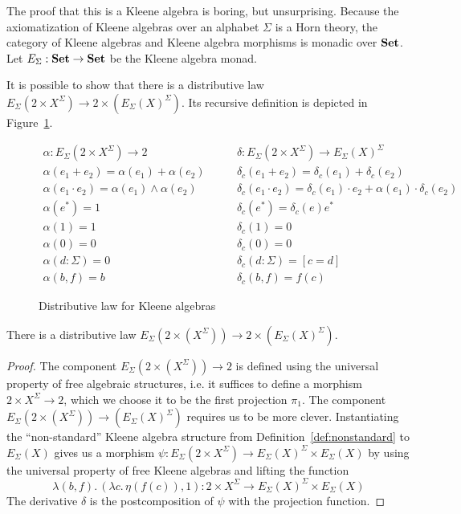 \documentclass[acmsmall,anonymous,review,screen]{acmart}
\newcommand{\cat}[1]{
  \relax
  \StrLen{#1}[\arglength]
  \ifnum\arglength=1
  \mathcal{#1}
  \else
  \mathbf{#1}
  \fi
}
\newcommand{\Set}{\cat{Set}}
\begin{document}
The proof that this is a Kleene algebra is boring, but unsurprising.
Because the axiomatization of Kleene algebras over an alphabet $\Sigma$
is a Horn theory, the category of Kleene algebras and Kleene algebra
morphisms is monadic over $\Set$. Let $E_\Sigma : \Set \to \Set$ be the 
Kleene algebra monad.

It is possible to show that there is a distributive law
$E_\Sigma(2 \times X^\Sigma) \to 2 \times (E_\Sigma(X)^\Sigma)$.
Its recursive definition is depicted in Figure~\ref{fig:distlaw}. 
%
\begin{figure}
  \begin{align*}
    \alpha : E_\Sigma(2 \times X^\Sigma) \to 2 \quad\quad & \delta : E_\Sigma(2 \times X^\Sigma) \to E_\Sigma(X)^\Sigma\\
  \alpha(e_1 + e_2) = \alpha(e_1) + \alpha(e_2) \quad \quad & \delta_c(e_1 + e_2) = \delta_c(e_1) + \delta_c(e_2)\\ 
  \alpha(e_1\cdot e_2) = \alpha(e_1) \land \alpha(e_2) \quad \quad& \delta_c(e_1\cdot e_2) = \delta_c(e_1)\cdot e_2 + \alpha(e_1)\cdot \delta_c(e_2)\\ 
  \alpha(e^*) = 1 \quad \quad& \delta_c(e^*) = \delta_c(e)e^*\\ 
  \alpha(1) = 1 \quad \quad& \delta_c(1) = 0\\ 
  \alpha(0) = 0 \quad \quad& \delta_c(0) = 0\\ 
  \alpha(d : \Sigma) = 0 \quad \quad& \delta_c(d : \Sigma) = [c = d]\\ 
  \alpha(b, f) = b \quad \quad& \delta_c(b, f) = f(c)  
\end{align*}
\caption{Distributive law for Kleene algebras}
\label{fig:distlaw}
\end{figure}

\begin{theorem}
  There is a distributive law $E_\Sigma(2 \times (X^\Sigma)) \to 2 \times (E_\Sigma(X)^\Sigma)$.
\end{theorem}
\begin{proof}
  The component $E_\Sigma(2 \times (X^\Sigma)) \to 2$ is
  defined using the universal property of free algebraic structures,
  i.e. it suffices to define a morphism $2 \times X^\Sigma \to 2$,
  which we choose it to be the first projection
  $\pi_1$. The component $E_\Sigma(2 \times (X^\Sigma)) \to (E_\Sigma(X)^\Sigma)$
  requires us to be more
  clever. Instantiating the ``non-standard'' Kleene algebra structure from
  Definition~\ref{def:nonstandard} to $E_\Sigma(X)$
  gives us a morphism $\psi : E_\Sigma(2 \times X^\Sigma) \to E_\Sigma(X)^\Sigma \times E_\Sigma(X)$
  by using the universal property of free Kleene
  algebras and lifting the function
  \[\lambda (b, f).\, (\lambda c.\, \eta(f(c)), 1) : 2 \times X^\Sigma \to E_\Sigma(X)^\Sigma \times E_\Sigma(X)\]
  The derivative $\delta$ is the postcomposition of $\psi$ with the
  projection function.
\end{proof}
\end{document}

